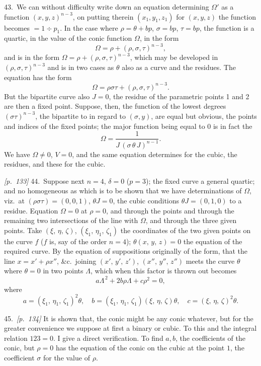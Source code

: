 \documentclass[11pt,a4paper]{book}
\begin{document}
43.\ We can without difficulty write down an equation determining $\Omega'$ as a function $(x, y, z)^{n - 3}$, on putting therein $(x_1, y_1, z_1)$ for $(x, y, z)$ the function becomes $= 1 \div p_1$. In the case where $\rho = \theta + bp$, $\sigma = bp$, $\tau = bp$, the function is a quartic, in the value of the conic function $\Omega$, in the form
\[
\Omega = \rho + (\rho, \sigma, \tau)^{n - 3},
\]
and is in the form $\Omega = \rho + (\rho, \sigma, \tau)^{n - 3}$, which may be developed in $(\rho, \sigma, \tau)^{n - 3}$ and is in two cases as $\theta$ also as a curve and the residues. The equation has the form
\[
\Omega = \rho\sigma\tau + (\rho, \sigma, \tau)^{n - 3}.
\]
But the bipartite curve also $J = 0$, the residue of the parametric points 1 and 2 are then a fixed point. Suppose, then, the function of the lowest degrees $(\sigma\tau)^{n - 3}$, the bipartite to in regard to $(\sigma, y)$, are equal but obvious, the points and indices of the fixed points; the major function being equal to $0$ is in fact the
\[
\Omega = \frac{1}{J\,(\sigma\,\theta\,J)^{n - 1}}.
\]
We have $\Omega \neq 0$, $V = 0$, and the same equation determines for the cubic, the residues, and these for the cubic.

\textit{[p.~133]} 44.\ Suppose next $n = 4$, $\delta = 0$ ($p = 3$); the fixed curve a general quartic; and no homogeneous as which is to be shown that we have determinations of $\Omega$, viz.\ at $(\rho \sigma \tau) = (0,0,1)$, $\theta J = 0$, the cubic conditions $\theta J = (0,1,0)$ to a residue. Equation $\Omega = 0$ at $\rho = 0$, and through the points and through the remaining two intersections of the line with $\Omega$, and through the three given points. Take $(\xi,\,\eta,\,\zeta)$, $(\xi_1,\,\eta_1,\,\zeta_1)$ the coordinates of the two given points on the curve $f$ ($f$ is, say of the order $n = 4$); $\theta(x,\,y,\,z) = 0$ the equation of the required curve. By the equation of suppositions originally of the form, that the line $x = x' + \rho x''$, \&c.\ joining $(x',\,y',\,z')$, $(x'',\,y'',\,z'')$ meets the curve $\theta$ where $\theta = 0$ in two points $\Lambda$, which when this factor is thrown out becomes
\[
a\Lambda^{\,2} + 2b\rho\Lambda + c\rho^2 = 0,
\]
where
\[
a = (\xi_1,\,\eta_1,\,\zeta_1)^2 \theta,\quad b = (\xi_1,\,\eta_1,\,\zeta_1)(\xi,\,\eta,\,\zeta)\theta,\quad c = (\xi,\,\eta,\,\zeta)^2 \theta.
\]

45.\ \textit{[p.~134]} It is shown that, the conic might be any conic whatever, but for the greater convenience we suppose at first a binary or cubic. To this and the integral relation $123 = 0$. I give a direct verification. To find $a, b$, the coefficients of the conic, but $\rho = 0$ has the equation of the conic on the cubic at the point $1$, the coefficient $\sigma$ for the value of $\rho$.
\end{document}
